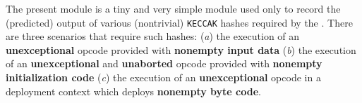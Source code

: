 The present \hashInfoMod{} module is a tiny and very simple module used only to record the (predicted) output of various (nontrivial) \texttt{KECCAK} hashes required by the \zkEvm{}.
There are three scenarios that require such hashes:
(\emph{a}) the execution of an \textbf{unexceptional}  opcode provided with \textbf{nonempty input data}
(\emph{b}) the execution of an \textbf{unexceptional} and \textbf{unaborted}  opcode provided with \textbf{nonempty initialization code} 
(\emph{c}) the execution of an \textbf{unexceptional}  opcode in a deployment context which deploys \textbf{nonempty byte code}.
